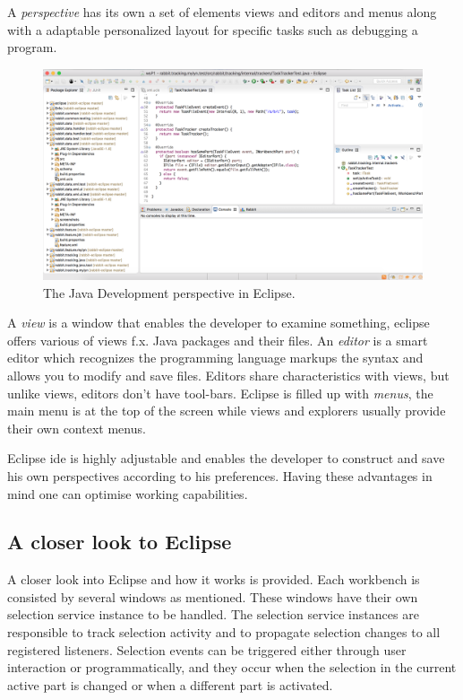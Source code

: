 A \textit{perspective} has its own a set of elements views and editors and menus along with a adaptable personalized layout for specific tasks such as debugging a program. 
	\begin{figure}[!ht]
		\begin{center}
		 
        \includegraphics[width=\textwidth]{figures/eclipseWS.png}
		\end{center}
		\caption{The Java Development perspective in Eclipse.}
		\label{fig:eclipse_workspace}
	\end{figure}
A \textit{view} is a window that enables the developer to examine something, eclipse offers various of views f.x. Java packages and their files. An \textit{editor} is a smart editor which recognizes the programming language markups the syntax and allows you to modify and save files. Editors share characteristics with views, but unlike views, editors don't have tool-bars. Eclipse is filled up with \textit{menus}, the main menu is at the top of the screen while views and explorers usually provide their own context menus.

Eclipse \gls{ide} is highly adjustable and enables the developer to construct and save his own perspectives according to his preferences. Having these advantages in mind one can optimise working capabilities.

\subsection{A closer look to Eclipse}
A closer look into Eclipse and how it works is provided. Each workbench is consisted by several windows as mentioned. These windows have their own selection service instance to be handled. The selection service instances are responsible to track selection activity and to propagate selection changes to all registered listeners. Selection events can be triggered either through user interaction or programmatically, and they occur when the selection in the current active part is changed or when a different part is activated. 

